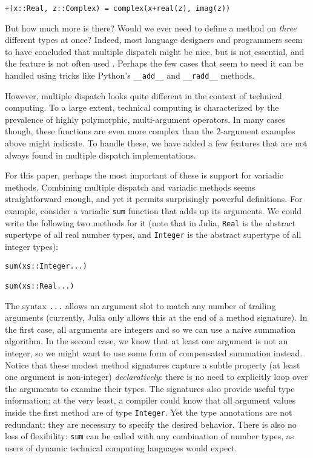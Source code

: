 \documentclass[preprint]{sigplanconf}
\newcommand{\code}[1]{\texttt{#1}}
\begin{document}
\begin{verbatim}
+(x::Real, z::Complex) = complex(x+real(z), imag(z))
\end{verbatim}

But how much more is there? Would we ever need to define a method on
\emph{three} different types at once? Indeed, most language designers and
programmers seem to have concluded that multiple dispatch might be nice, but is
not essential, and the feature is not often used \cite{Muschevici:2008}.
Perhaps the few cases that seem to need it can be handled using tricks like
Python's \code{\_\_add\_\_} and \code{\_\_radd\_\_} methods.

However, multiple dispatch looks quite different in the context of technical
computing. To a large extent, technical computing is characterized
by the prevalence of highly polymorphic, multi-argument operators. In many
cases though, these functions are even more complex than the 2-argument
examples above might indicate. To handle these, we have added a few
features that are not always found in multiple dispatch implementations.

For this paper, perhaps the most important of these is support for
variadic methods. Combining multiple dispatch and variadic methods
seems straightforward
enough, and yet it permits surprisingly powerful definitions. For example,
consider a variadic \code{sum} function that adds up its arguments. We could
write the following two methods for it (note that in Julia, \code{Real} is
the abstract supertype of all real number types, and \code{Integer} is the
abstract supertype of all integer types):

\begin{verbatim}
sum(xs::Integer...)

sum(xs::Real...)
\end{verbatim}

The syntax \code{...} allows an argument slot to match any number of trailing
arguments (currently, Julia only allows this at the end of a method signature).
In the first case, all arguments are integers and so we can use a naive
summation algorithm. In the second case, we know that at least one argument
is not an integer, so we might want to use some form of compensated
summation instead. Notice that these modest method signatures
capture a subtle property (at least one argument is non-integer)
\emph{declaratively}: there is no need to explicitly loop over the arguments
to examine their types. The signatures also provide useful type information:
at the very least, a compiler could know that all argument values inside
the first method are of type \code{Integer}. Yet the type annotations
are not redundant: they are necessary to specify the desired behavior. There
is also no loss of flexibility: \code{sum} can be called with any combination
of number types, as users of dynamic technical computing languages would expect.
\end{document}
